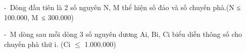 - Dòng đầu tiên là 2 số nguyên N, M thể hiện số đảo và số chuyến phà.(N ≤ 100.000, M ≤ 300.000)  

   - M dòng sau mỗi dòng 3 số nguyên dương Ai, Bi, Ci biểu diễn thông số cho chuyến phà thứ i. (Ci  $\le$  1.000.000)
